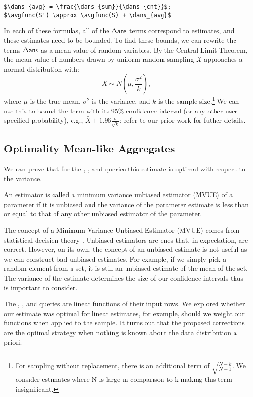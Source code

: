 \begin{lstlisting}[mathescape,basicstyle={\scriptsize}]
$\dans_{avg} = \frac{\dans_{sum}}{\dans_{cnt}}$;
$\avgfunc(S') \approx \avgfunc(S) + \dans_{avg}$
\end{lstlisting}

In each of these formulas, all of the $\Delta\textsf{ans}$ terms correspond to estimates, and these estimates need to be bounded.
To find these bounds, we can rewrite the terms $\Delta\textsf{ans}$ as a mean value of random variables.
By the Central Limit Theorem, the mean value of numbers drawn by uniform random sampling $\bar{X}$ approaches a normal distribution with:
\[
\bar{X} \sim N(\mu,\frac{\sigma^2}{k}),
\]
where $\mu$ is the true mean, $\sigma^2$ is the variance, and $k$ is the sample size.\footnote{\scriptsize For sampling without replacement, there is an additional term of $\sqrt{\frac{N-k}{N-1}}$. We consider estimates where N is large in comparison to k making this term insignificant.}
We can use this to bound the term with its 95\% confidence interval (or any other user specified probability), e.g., $\bar{X} \pm 1.96 \frac{\sigma}{\sqrt{k}}$; refer to our prior work \cite{wang1999sample} for futher details.

\subsection{Optimality Mean-like Aggregates}
We can prove that for the \sumfunc, \countfunc, and \avgfunc queries this estimate is optimal with respect to the variance.
\begin{proposition}
An estimator is called a minimum variance unbiased estimator (MVUE) of a parameter if it is unbiased and the variance of the parameter estimate is less than or equal to that of any other unbiased estimator of the parameter.
\end{proposition}
The concept of a Minimum Variance Unbiased Estimator (MVUE) comes from statistical decision theory \cite{cox1979theoretical}.
Unbiased estimators are ones that, in expectation, are correct.
However, on its own, the concept of an unbiased estimate is not useful as we can construct bad unbiased estimates.
For example, if we simply pick a random element from a set, it is still an unbiased estimate of the mean of the set.
The variance of the estimate determines the size of our confidence intervals thus is important to consider.

The \sumfunc, \countfunc, and \avgfunc queries are linear functions of their input rows.
We explored whether our estimate was optimal for linear estimates, for example, should we weight our functions when applied to the sample.
It turns out that the proposed corrections are the optimal strategy when nothing is known about the data distribution a priori.

